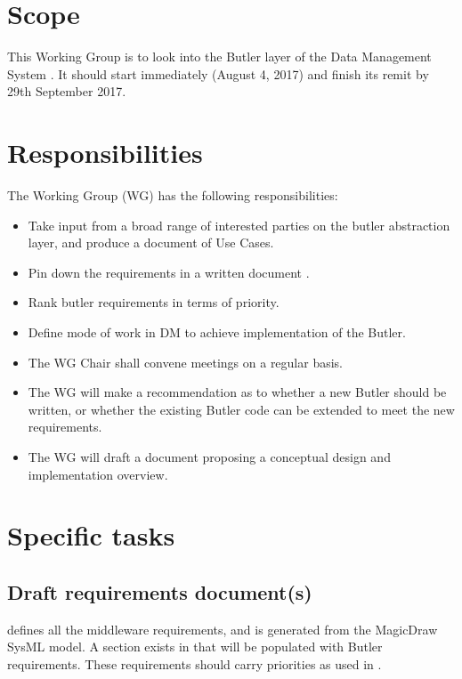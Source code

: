 \section{Scope}

This Working Group is to look into the Butler layer of the Data Management System .
It should start immediately (August 4, 2017) and finish its remit by 29th September 2017.


\section{Responsibilities}

The Working Group (WG) has the following responsibilities:

\begin{itemize}
 \item Take input from a broad range of interested parties on the butler abstraction layer, and produce a document of Use Cases.
 \item Pin down the requirements in a written document .
 \item Rank butler requirements in terms of priority.
  \item Define mode of work in DM to achieve implementation of the Butler.
 \item The WG Chair shall convene meetings on a regular basis.
 \item The WG will make a recommendation as to whether a new Butler should be written, or whether the existing Butler code can be extended to meet the new requirements.
 \item The WG will draft a document proposing a conceptual design and implementation overview.
\end{itemize}

\section{Specific tasks}

\subsection{Draft requirements document(s)}

 defines all the middleware requirements, and is generated from the MagicDraw SysML model.
A section exists in  that will be populated with Butler requirements.
These requirements should carry priorities as used in .

